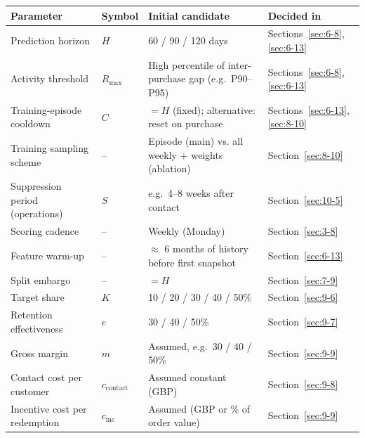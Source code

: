 \begin{center}
\begin{tabular}{@{}p{3.6cm}p{1.3cm}p{5.8cm}p{3.2cm}@{}}
    \toprule
    Parameter & Symbol & Initial candidate & Decided in \\
    \midrule
    Prediction horizon & $H$ & 60 / 90 / 120 days & Sections~\ref{sec:6-8}, \ref{sec:6-13} \\
    Activity threshold & $R_{\max}$ & High percentile of inter-purchase gap (e.g.\ P90--P95) & Sections~\ref{sec:6-8}, \ref{sec:6-13} \\
    Training-episode cooldown & $C$ & $= H$ (fixed); alternative: reset on purchase & Sections~\ref{sec:6-13}, \ref{sec:8-10} \\
    Training sampling scheme & -- & Episode (main) vs. all weekly + weights (ablation) & Section~\ref{sec:8-10} \\
    Suppression period (operations) & $S$ & e.g.\ 4--8 weeks after contact & Section~\ref{sec:10-5} \\
    Scoring cadence & -- & Weekly (Monday) & Section~\ref{sec:3-8} \\
    Feature warm-up & -- & $\approx$ 6 months of history before first snapshot & Section~\ref{sec:6-13} \\
    Split embargo & -- & $= H$ & Section~\ref{sec:7-9} \\
    Target share & $K$ & 10 / 20 / 30 / 40 / 50\% & Section~\ref{sec:9-6} \\
    Retention effectiveness & $e$ & 30 / 40 / 50\% & Section~\ref{sec:9-7} \\
    Gross margin & $m$ & Assumed, e.g.\ 30 / 40 / 50\% & Section~\ref{sec:9-9} \\
    Contact cost per customer & $c_{\text{contact}}$ & Assumed constant (GBP) & Section~\ref{sec:9-8} \\
    Incentive cost per redemption & $c_{\text{inc}}$ & Assumed (GBP or \% of order value) & Section~\ref{sec:9-9} \\
    \bottomrule
\end{tabular}
\end{center}
